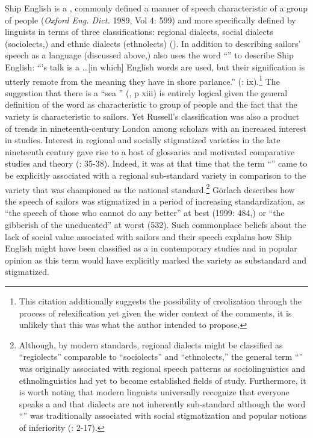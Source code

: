 Ship English is a , commonly defined a manner of speech characteristic of a group of people (\textit{Oxford Eng. Dict.} 1989, Vol 4: 599) and more specifically defined by linguists in terms of three classifications: regional dialects, social dialects (sociolects,) and ethnic dialects (ethnolects) (\citealt{WolframSchilling2016}). In addition to describing sailors’ speech as a language (discussed above,) \citet{Russell1883} also uses the word “” to describe Ship English: “’s talk is a …[in which] English words are used, but their signification is utterly remote from the meaning they have in shore parlance.” (\citealt{Russell1883}: ix).\footnote{This citation additionally suggests the possibility of creolization through the process of relexification yet given the wider context of the comments, it is unlikely that this was what the author intended to propose.}  The suggestion that there is a “sea ” (\citealt{Russell1883}, p xiii) is entirely logical given the general definition of the word as characteristic to group of people and the fact that the variety is characteristic to sailors. Yet Russell’s classification was also a product of trends in nineteenth-century London among scholars with an increased interest in  studies. Interest in regional and socially stigmatized varieties in the late nineteenth century gave rise to a host of  glossaries {and motivated comparative studies and  theory (\citealt{Petyt1980}: 35-38). Indeed, it was at that time that the term “” came to be explicitly associated with a regional sub-standard variety in comparison to the variety that was championed as the national standard.}\footnote{{Although}, by modern standards, regional dialects might be classified as “regiolects” {comparable to “sociolects” and “ethnolects,” the general term “” was originally} associated with regional speech patterns as sociolinguistics and ethnolinguistics had yet to become established fields of study. Furthermore,{ it is worth noting that modern} linguists universally recognize that everyone speaks a  and that dialects are not inherently sub-standard although the word “” was traditionally associated with social stigmatization and popular notions of inferiority (\citealt{WolframSchilling2016}: 2-17).} {} Görlach describes how{ the} speech of sailors was stigmatized in a period of increasing standardization, as “the speech of those who cannot do any better” at best (1999: 484,) or “the gibberish of the uneducated” at worst (532).{ Such commonplace beliefs about the lack of social value associated with sailors and their speech explains how Ship English might have been classified as a  in contemporary studies and in popular opinion as this term would have explicitly marked the variety as substandard and stigmatized.}

